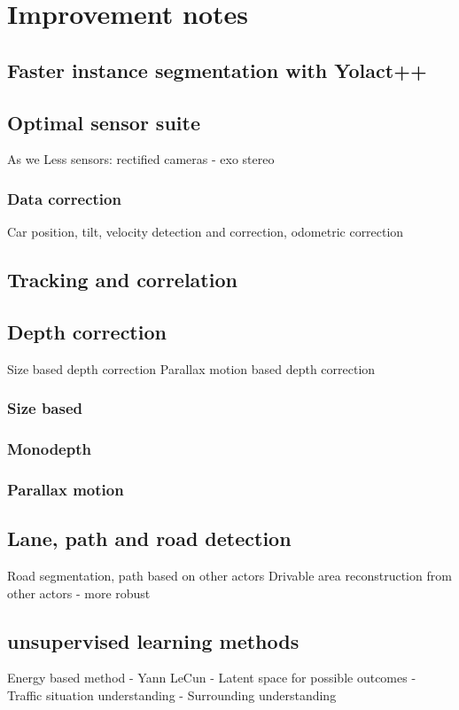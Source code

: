 \chapter{Improvement notes}
\label{chap:improvement}
\section{Faster instance segmentation with Yolact++}

\section{Optimal sensor suite}
As we 
Less sensors: rectified cameras - exo stereo
\subsection{Data correction}
Car position, tilt, velocity detection and correction, odometric correction
\section{Tracking and correlation}
\section{Depth correction}
Size based depth correction
Parallax motion based depth correction
\subsection{Size based}
\subsection{Monodepth}
\subsection{Parallax motion}
\section{Lane, path and road detection}
Road segmentation, path  based on other actors
Drivable area reconstruction from other actors - more robust
\section{unsupervised learning methods}
Energy based method - Yann LeCun
  - Latent space for possible outcomes
  - Traffic situation understanding
  - Surrounding understanding

